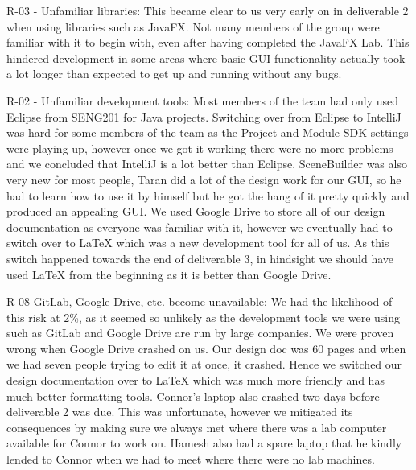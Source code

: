 R-03 - Unfamiliar libraries: This became clear to us very early on in deliverable 2 when using libraries such as JavaFX. Not many members of the group were familiar with it to begin with, even after having completed the JavaFX Lab. This hindered development in some areas where basic GUI functionality actually took a lot longer than expected to get up and running without any bugs.

R-02 - Unfamiliar development tools: Most members of the team had only used Eclipse from SENG201 for Java projects. Switching over from Eclipse to IntelliJ was hard for some members of the team as the Project and Module SDK settings were playing up, however once we got it working there were no more problems and we concluded that IntelliJ is a lot better than Eclipse.
SceneBuilder was also very new for most people, Taran did a lot of the design work for our GUI, so he had to learn how to use it by himself but he got the hang of it pretty quickly and produced an appealing GUI.
We used Google Drive to store all of our design documentation as everyone was familiar with it, however we eventually had to switch over to LaTeX which was a new development tool for all of us. As this switch happened towards the end of deliverable 3, in hindsight we should have used LaTeX from the beginning as it is better than Google Drive.

R-08 GitLab, Google Drive, etc. become unavailable: We had the likelihood of this risk at 2\%, as it seemed so unlikely as the development tools we were using such as GitLab and Google Drive are run by large companies. We were proven wrong when Google Drive crashed on us. Our design doc was 60 pages and when we had seven people trying to edit it at once, it crashed. Hence we switched our design documentation over to LaTeX which was much more friendly and has much better formatting tools.
Connor's laptop also crashed two days before deliverable 2 was due. This was unfortunate, however we mitigated its consequences by making sure we always met where there was a lab computer available for Connor to work on. Hamesh also had a spare laptop that he kindly lended to Connor when we had to meet where there were no lab machines.